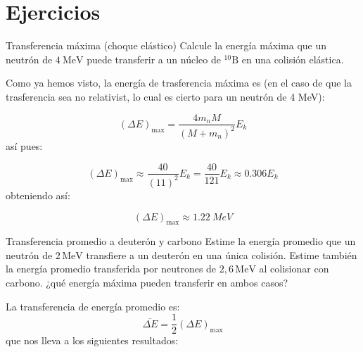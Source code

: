 \section*{Ejercicios}

\begin{Ejercicio}{Transferencia máxima (choque elástico)}\label{Ej:04-01}
Calcule la energía máxima que un neutrón de $4 \ \mathrm{MeV}$ puede transferir a un núcleo de $^{10}\mathrm{B}$ en una colisión elástica.
\end{Ejercicio}

Como ya hemos visto, la energía de trasferencia máxima es (en el caso de que la trasferencia sea no relativist, lo cual es cierto para un neutrón de 4 MeV): 

\begin{equation}
    (\Delta E)_{\max} = \frac{4m_n M}{(M+m_n)^2} E_{k}
\end{equation}
así pues: 

\begin{equation}
     (\Delta E)_{\max} \approx \frac{40}{(11)^2} E_k = \frac{40}{121} E_k \approx 0.306 E_k
\end{equation}
obteniendo así: 

\begin{equation}
     (\Delta E)_{\max} \approx \SI{1.22}{MeV}
\end{equation}




\begin{Ejercicio}{Transferencia promedio a deuterón y carbono}\label{Ej:04-02}
Estime la energía promedio que un neutrón de $2\,\mathrm{MeV}$ transfiere a un deuterón en una única colisión. 
Estime también la energía promedio transferida por neutrones de $2{,}6\,\mathrm{MeV}$ al colisionar con carbono.
¿qué energía máxima pueden transferir en ambos casos?
\end{Ejercicio}

La transferencia de energía promedio es: 
\begin{equation}
    \overline{\Delta E} = \frac{1}{2} (\Delta E)_{\max}
\end{equation}
que nos lleva a los siguientes resultados:

